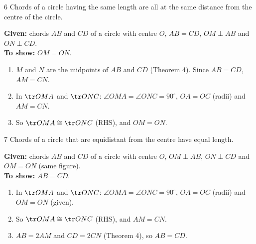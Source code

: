 \begin{theorem}{6}
Chords of a circle having the same length are all at the same distance from the centre of the circle.
\end{theorem}


\why
\textbf{Given:} chords $AB$ and $CD$ of a circle with centre $O$, $AB=CD$, $OM\perp AB$ and $ON\perp CD$.\\
\textbf{To show:} $OM=ON$.
\begin{enumerate}[leftmargin=1.8em,itemsep=1pt]
  \item $M$ and $N$ are the midpoints of $AB$ and $CD$ (Theorem 4). Since $AB=CD$, $AM=CN$.
  \item In $\tr OMA$ and $\tr ONC$: $\angle OMA=\angle ONC=90^\circ$, $OA=OC$ (radii) and $AM=CN$.
  \item So $\tr OMA\cong\tr ONC$ (RHS), and $OM=ON$.
\end{enumerate}

\begin{theorem}{7}
Chords of a circle that are equidistant from the centre have equal length.
\end{theorem}

\why
\textbf{Given:} chords $AB$ and $CD$ of a circle with centre $O$, $OM\perp AB$, $ON\perp CD$ and $OM=ON$ (same figure).\\
\textbf{To show:} $AB=CD$.
\begin{enumerate}[leftmargin=1.8em,itemsep=1pt]
  \item In $\tr OMA$ and $\tr ONC$: $\angle OMA=\angle ONC=90^\circ$, $OA=OC$ (radii) and $OM=ON$ (given).
  \item So $\tr OMA\cong\tr ONC$ (RHS), and $AM=CN$.
  \item $AB=2AM$ and $CD=2CN$ (Theorem 4), so $AB=CD$.
\end{enumerate}

